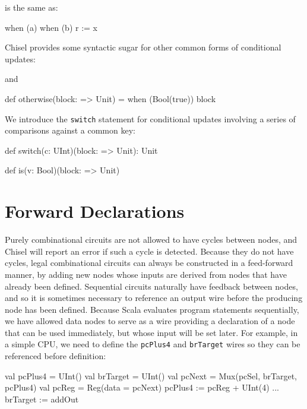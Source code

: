 \documentclass[10pt,twocolumn]{article}
\def\code#1{{\small\tt #1}}
\begin{document}
\noindent
is the same as:

\begin{scala}
when (a) { 
  when (b) { r := x } 
}
\end{scala}


Chisel provides some syntactic sugar for other common forms of
conditional updates:

\begin{scala}
def unless(c: Bool)(block: => Unit) = 
  when (!c) { block )
\end{scala}

\noindent 
and

\begin{scala}
def otherwise(block: => Unit) = 
  when (Bool(true)) { block }
\end{scala}

We introduce the \code{switch} statement for conditional updates
involving a series of comparisons against a common key:

\begin{scala}
def switch(c: UInt)(block: => Unit): Unit

def is(v: Bool)(block: => Unit)
\end{scala}

\section{Forward Declarations}

Purely combinational circuits are not allowed to have cycles between
nodes, and Chisel will report an error if such a cycle is detected.
Because they do not have cycles, legal combinational circuits can
always be constructed in a feed-forward manner, by adding new nodes
whose inputs are derived from nodes that have already been defined.
Sequential circuits naturally have feedback between nodes, and so it
is sometimes necessary to reference an output wire before the
producing node has been defined.  Because Scala evaluates program
statements sequentially, we have allowed data nodes to serve as a wire
providing a declaration of a node that can be used immediately, but
whose input will be set later.  For example, in a simple CPU, we need
to define the \verb!pcPlus4!  and \verb!brTarget! wires so they can be
referenced before definition:
\begin{scala}
val pcPlus4  = UInt()
val brTarget = UInt()
val pcNext   = Mux(pcSel, brTarget, pcPlus4)
val pcReg    = Reg(data = pcNext)
pcPlus4     := pcReg + UInt(4)
...
brTarget    := addOut
\end{scala}
\end{document}
